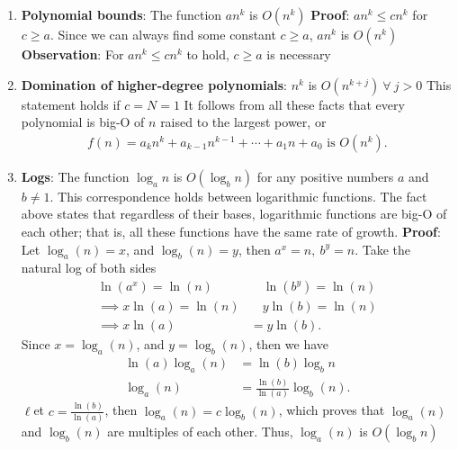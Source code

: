 \documentclass{report}
\begin{document}
\begin{itemize}
\begin{enumerate}
        \item \textbf{Polynomial bounds}: The function $an^{k}$ is $O(n^{k})$
            \bigbreak \noindent 
            \textbf{Proof}: $an^{k} \leq cn^{k}$ for $c \geq a$. Since we can always find some constant $c \geq a$, $an^{k}$ is $O(n^{k})$
            \bigbreak \noindent 
            \textbf{Observation}: For $an^{k} \leq cn^{k}$ to hold, $c \geq a$ is necessary
        \item \textbf{Domination of higher-degree polynomials}: $n^{k}$ is $O(n^{k+j}) \ \forall \ j > 0 $
            \bigbreak \noindent 
            This statement holds if $c = N = 1$
            \bigbreak \noindent 
            It follows from all these facts that every polynomial is big-O of $n$ raised to the largest power, or
            \begin{align*}
                f(n) = a_k n^k + a_{k-1} n^{k-1} + \cdots + a_1 n + a_0 \text{ is } O(n^k)
            .\end{align*}
        \item \textbf{Logs}: The function $\log_a n$ is $O(\log_b n)$ for any positive numbers $a$ and $b \neq 1$.
            \bigbreak \noindent 
            This correspondence holds between logarithmic functions. The fact above states that regardless of their bases, logarithmic functions are big-O of each other; that is, all these functions have the same rate of growth.
            \bigbreak \noindent 
            \textbf{Proof}: Let $\log_{a}(n) = x$, and $\log_{b}(n) = y $, then $a^{x} = n,\ b^{y} =n$. Take the natural log of both sides
            \begin{align*}
                \ln{(a^{x})} = \ln{(n)} &\quad \ln{(b^{y})} = \ln{(n)} \\
                \implies x\ln{(a)} = \ln{(n)} &\quad y\ln{(b)} = \ln{(n)} \\
                \implies x\ln{(a)} &= y\ln{(b)}
            .\end{align*}
            Since $x = \log_{a}{(n)}$, and $y=\log_{b}{(n)}$, then we have
            \begin{align*}
                \ln{(a)}\log_{a}{(n)} &= \ln{(b)}\log_{b}{n} \\
                \log_{a}{(n)} &= \frac{\ln{(b)}}{\ln{(a)}} \log_{b}{(n)}
            .\end{align*}
            $\ell$et $c=\frac{\ln{(b)}}{\ln{(a)}}$, then $\log_{a}{(n)} = c\log_{b}{(n)}$, which proves that $\log_{a}(n)$ and $\log_{b}{(n)}$ are multiples of each other. Thus, $\log_{a}{(n)}$ is $O(\log_{b}{n})$

\end{enumerate}
\end{itemize}
\end{document}
